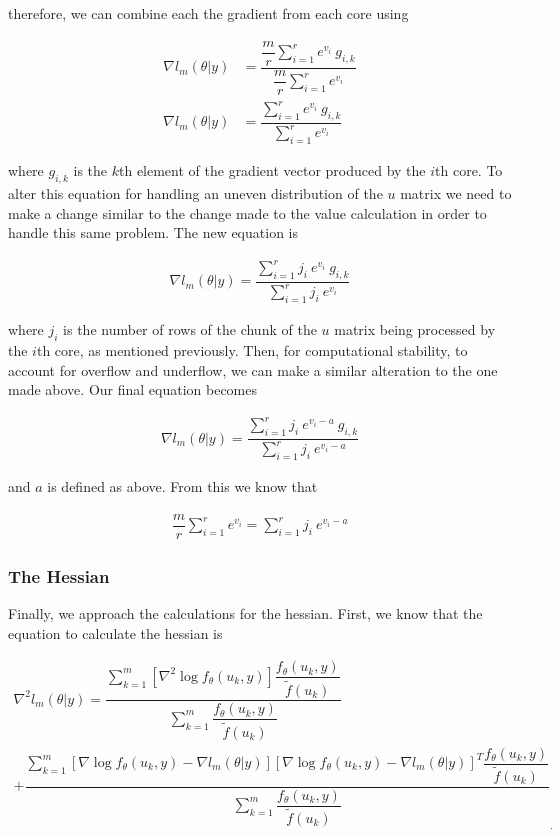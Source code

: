 \documentclass{article}
\begin{document}
\noindent therefore, we can combine each the gradient from each core using

\begin{align}
\nabla l_m(\theta|y) &=\dfrac{\dfrac{m}{r} \sum\limits_{i=1}^r e^{v_i} \ g_{i,k}}{\dfrac{m}{r} \sum\limits_{i=1}^r e^{v_i}} \\
\nabla l_m(\theta|y) &=\dfrac{ \sum\limits_{i=1}^r e^{v_i} \ g_{i,k}}{\sum\limits_{i=1}^r e^{v_i}}
\end{align}

\noindent where $g_{i,k}$ is the $k$th element of the gradient vector produced by the $i$th core. To alter this equation for handling an uneven distribution of the $u$ matrix we need to make a change similar to the change made to the value calculation in order to handle this same problem. The new equation is

\begin{align}
\nabla l_m(\theta|y) =\dfrac{ \sum\limits_{i=1}^r j_i \ e^{v_i} \ g_{i,k}}{\sum\limits_{i=1}^r j_i \ e^{v_i}}
\end{align}

\noindent where $j_i$ is the number of rows of the chunk of the $u$ matrix being processed by the $i$th core, as mentioned previously. Then, for computational stability, to account for overflow and underflow, we can make a similar alteration to the one made above. Our final equation becomes

\begin{align}
\nabla l_m(\theta|y) =\dfrac{ \sum\limits_{i=1}^r j_i \ e^{v_i - a} \ g_{i,k}}{\sum\limits_{i=1}^r j_i \ e^{v_i - a}}
\end{align}

\noindent and $a$ is defined as above. From this we know that

\begin{align}
\dfrac{m}{r} \sum\limits_{i=1}^r e^{v_i} = \sum\limits_{i=1}^r j_i \ e^{v_i - a}
\end{align}

\subsubsection{The Hessian}
Finally, we approach the calculations for the hessian. First, we know that the equation to calculate the hessian is 

\begin{multline}
\nabla^2 l_m(\theta|y)= \dfrac{   \sum_{k=1}^m \left[ \nabla^2 \log f_\theta(u_k,y)     \right]  \dfrac{ f_\theta(u_k,y)}{\tilde{f}(u_k)}  }{\sum_{k=1}^m  \dfrac{ f_\theta(u_k,y)   }{\tilde{f}(u_k)}}\\
+ \dfrac{   \sum_{k=1}^m \left[ \nabla \log f_\theta(u_k,y)  - \nabla l_m(\theta|y)   \right] \left[ \nabla \log f_\theta(u_k,y)  -\nabla l_m(\theta|y)  \right]^T  \dfrac{ f_\theta(u_k,y)   }{\tilde{f}(u_k)}   }{\sum_{k=1}^m  \dfrac{ f_\theta(u_k,y)   }{\tilde{f}(u_k)}}_.
\end{multline}
\end{document}
